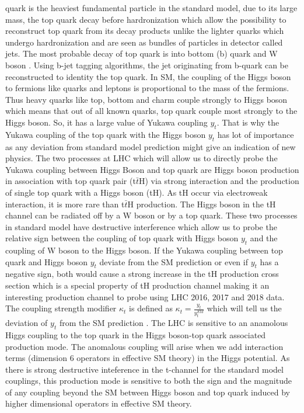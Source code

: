 \documentclass[final,3p]{CSP}
\begin{document}
quark is the heaviest fundamental particle in the standard model, due to its large mass, the 
top quark decay before 
hardronization which allow the possibility to reconstruct top quark from its decay products 
unlike the lighter quarks which 
undergo hardronization and are seen as bundles of particles in detector called jets. The most 
probable decay of top quark is 
into bottom (b) quark and W boson \cite{nishiwaki2014tth}. Using b-jet tagging algorithms, the jet originating from 
b-quark can be reconstructed to 
identity the top quark. In SM, the coupling of the Higgs boson to fermions like quarks and 
leptons is proportional to the mass 
of the fermions. Thus heavy quarks like top, bottom and charm couple strongly to Higgs boson 
which means that out of all known 
quarks, top quark couple most strongly to the Higgs boson. So, it has a large value of Yukawa 
coupling $y_t$. That is why the 
Yukawa coupling of the top quark with the Higgs boson $y_t$ has lot of importance as any 
deviation from standard model prediction might give an indication of new physics. The two 
processes at LHC which will allow us to directly probe the Yukawa 
coupling between Higgs Boson and top quark are Higgs boson production in association with top 
quark pair (t$\bar{t}$H) via 
strong interaction and the production of single top quark with a Higgs boson (tH). As tH 
occur via electroweak interaction, it 
is more rare than t$\bar{t}$H production. The Higgs boson in the tH channel can be radiated 
off by a W boson or by a top 
quark. These two processes in standard model have destructive interference which allow us to 
probe the relative sign between 
the coupling of top quark with Higgs boson $y_t$ and the coupling of W boson to the Higgs 
boson. If the Yukawa coupling between top quark and Higgs boson $y_t$ deviate from the SM 
prediction or even if $y_t$ has a negative sign, both would cause a strong increase in the tH 
production cross section which is a special property of tH production channel making it an 
interesting production channel to probe using LHC 2016, 2017 and 2018 data. The coupling 
strength modifier $\kappa_t$ is defined as $\kappa_t = \frac{y_t}{y^{SM}_t}$ which will tell 
us the deviation of $y_t$ from the SM prediction \cite{sirunyan2019search}. 
The LHC is sensitive to an anamolous Higgs coupling to the top quark in the Higgs boson-top 
quark associated production mode. 
The anomalous coupling will arise when we add interaction terms (dimension 6 operators in 
effective SM theory) in the Higgs 
potential. As there is strong destructive inteference in the t-channel for the standard model 
couplings, this production mode 
is sensitive to both the sign and the magnitude of any coupling beyond the SM between Higgs 
boson and top quark induced by 
higher dimensional operators in effective SM theory.
\end{document}
